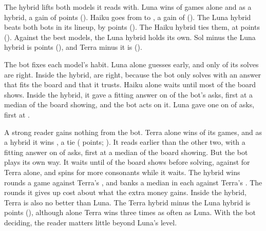 The hybrid lifts both models it reads with. Luna wins \LunaWin{} of games alone and \LunaHybridWin{} as a hybrid, a gain of \PairLunaHybridMinusLunaAlone{} points (\PairLunaHybridMinusLunaAloneCI). Haiku goes from \HaikuWin{} to \HaikuHybridWin{}, a gain of \PairHaikuHybridMinusHaikuAlone{} (\PairHaikuHybridMinusHaikuAloneCI). The Luna hybrid beats both bots in its lineup, by \LunaHybridVsBots{} points (\LunaHybridVsBotsCI). The Haiku hybrid ties them, at \HaikuHybridVsBots{} points (\HaikuHybridVsBotsCI). Against the best models, the Luna hybrid holds its own. Sol minus the Luna hybrid is \PairSolMinusTheLunaHybrid{} points (\PairSolMinusTheLunaHybridCI), and Terra minus it is \PairTerraMinusTheLunaHybrid{} (\PairTerraMinusTheLunaHybridCI).

The bot fixes each model's habit. Luna alone guesses early, and only \LunaAcc{} of its solves are right. Inside the hybrid, \LunaHybridAcc{} are right, because the bot only solves with an answer that fits the board and that it trusts. Haiku alone waits until most of the board shows. Inside the hybrid, it gave a fitting answer on \HaikuHybridAskFit{} of the bot's asks, first at a median \HaikuHybridAskFirstShown{} of the board showing, and the bot acts on it. Luna gave one on \LunaHybridAskFit{} of asks, first at \LunaHybridAskFirstShown{}.

A strong reader gains nothing from the bot. Terra alone wins \TerraWin{} of its games, and as a hybrid it wins \TerraHybridWin{}, a tie (\PairTerraHybridMinusTerraAlone{} points; \PairTerraHybridMinusTerraAloneCI). It reads earlier than the other two, with a fitting answer on \TerraHybridAskFit{} of asks, first at a median \TerraHybridAskFirstShown{} of the board showing. But the bot plays its own way. It waits until \TerraHybridShown{} of the board shows before solving, against \TerraShown{} for Terra alone, and spins for more consonants while it waits. The hybrid wins \TerraHybridRounds{} rounds a game against Terra's \TerraRounds{}, and banks a median \TerraHybridRoundMoney{} in each against Terra's \TerraRoundMoney. The rounds it gives up cost about what the extra money gains. Inside the hybrid, Terra is also no better than Luna. The Terra hybrid minus the Luna hybrid is \PairTerraHybridMinusLunaHybrid{} points (\PairTerraHybridMinusLunaHybridCI), although alone Terra wins three times as often as Luna. With the bot deciding, the reader matters little beyond Luna's level.

